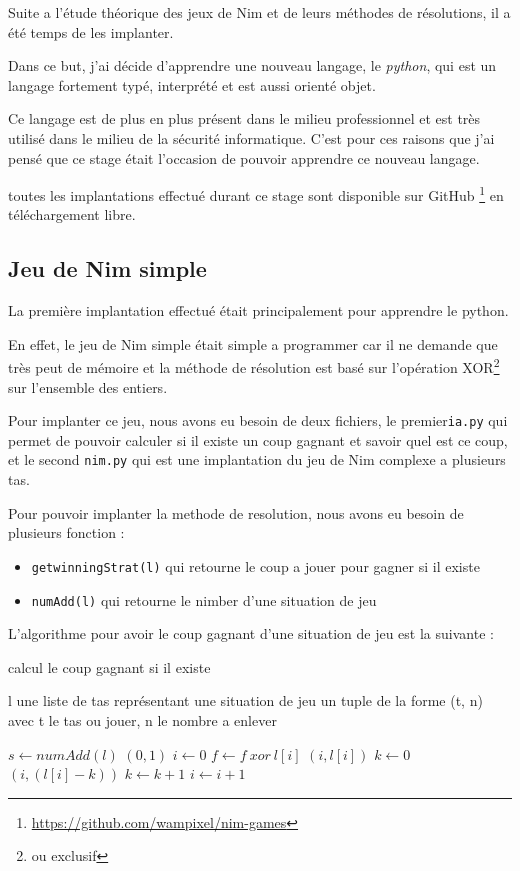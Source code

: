 Suite a l’étude théorique des jeux de Nim et de leurs méthodes de résolutions, il a été temps de les implanter.

Dans ce but, j'ai décide d'apprendre une nouveau langage, le \textit{python}, qui est un langage fortement typé, interprété et est aussi orienté objet. 

Ce langage est de plus en plus présent dans le milieu professionnel et est très utilisé dans le milieu de la sécurité informatique. C'est pour ces raisons que j'ai pensé que ce stage était l'occasion de pouvoir apprendre ce nouveau langage.

toutes les implantations effectué durant ce stage sont disponible sur GitHub \footnote{\url{https://github.com/wampixel/nim-games}} en téléchargement libre.
\subsection{Jeu de Nim simple}
\label{sub:Jeu de Nim simple}

La première implantation effectué était principalement pour apprendre le python.

En effet, le jeu de Nim simple était simple a programmer car il ne demande que très peut de mémoire et la méthode de résolution est basé sur l’opération XOR\footnote{ou exclusif} sur l'ensemble des entiers.

Pour implanter ce jeu, nous avons eu besoin de deux fichiers, le premier\texttt{ia.py} qui permet de pouvoir calculer si il existe un coup gagnant et savoir quel est ce coup, et le second \texttt{nim.py} qui est une implantation du jeu de Nim complexe a plusieurs tas.

Pour pouvoir implanter la methode de resolution, nous avons eu besoin de plusieurs fonction :
\begin{itemize}
  \item \texttt{getwinningStrat(l)} qui retourne le coup a jouer pour gagner si il existe
  \item \texttt{numAdd(l)} qui retourne le nimber d'une situation de jeu 
\end{itemize}

L'algorithme pour avoir le coup gagnant d'une situation de jeu est la suivante :
\begin{algorithm}
  \caption{calcul le coup gagnant si il existe}
  \begin{algorithmic}
    \REQUIRE l une liste de tas représentant une situation de jeu
    \ENSURE un tuple de la forme (t, n) avec t le tas ou jouer, n le nombre a enlever
    
    \STATE $s \leftarrow numAdd(l)$
      \RETURN $(0, 1)$
    \ELSE
      \STATE $i \leftarrow 0$
        \STATE $f \leftarrow f\ xor\ l[i]$
          \RETURN $(i, l[i])$
        \ELSE
          \STATE $k \leftarrow 0$
              \RETURN $(i, (l[i] - k))$
            \ELSE
              \STATE $k \leftarrow k + 1$
            \ENDIF
          \ENDWHILE
        \ENDIF
        \STATE $i \leftarrow i + 1$
      \ENDWHILE
    \ENDIF
  \end{algorithmic}
\end{algorithm}    

